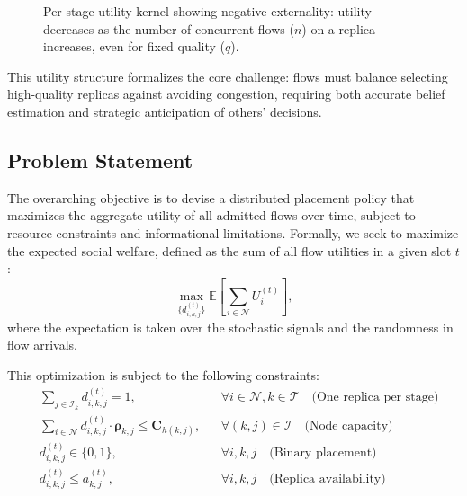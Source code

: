 \documentclass[journal]{IEEEtran}
\theoremstyle{plain}
\theoremstyle{definition}
\theoremstyle{remark}
\begin{document}
\begin{figure}[!t]
  \caption{Per-stage utility kernel showing negative externality: utility decreases as the number of concurrent flows ($n$) on a replica increases, even for fixed quality ($q$).}
  \label{fig:utility_function}
\end{figure}

This utility structure formalizes the core challenge: flows must balance selecting high-quality replicas against avoiding congestion, requiring both accurate belief estimation and strategic anticipation of others' decisions.


\subsection{Problem Statement}
\label{sec:sys_problem}

The overarching objective is to devise a distributed placement policy that maximizes the aggregate utility of all admitted flows over time, subject to resource constraints and informational limitations. Formally, we seek to maximize the expected social welfare, defined as the sum of all flow utilities in a given slot $t$:
\begin{equation}
\max_{\{d_{i,k,j}^{(t)}\}} \mathbb{E} \left[ \sum_{i \in \mathcal{N}} U_i^{(t)} \right],
\label{eq:social_welfare}
\end{equation}
where the expectation is taken over the stochastic signals and the randomness in flow arrivals.

This optimization is subject to the following constraints:
\begin{align}
& \sum_{j \in \mathcal{I}_k} d_{i,k,j}^{(t)} = 1, && \forall i \in \mathcal{N}, k \in \mathcal{T} \quad \text{(One replica per stage)} \label{eq:constraint_one_per_stage} \\
& \sum_{i \in \mathcal{N}} d_{i,k,j}^{(t)} \cdot \boldsymbol{\rho}_{k,j} \le \mathbf{C}_{h(k,j)}, && \forall (k,j) \in \mathcal{I} \quad \text{(Node capacity)} \label{eq:constraint_node_cap} \\
& d_{i,k,j}^{(t)} \in \{0,1\}, && \forall i,k,j \quad \text{(Binary placement)} \label{eq:constraint_binary} \\
& d_{i,k,j}^{(t)} \le a_{k,j}^{(t)}, && \forall i,k,j \quad \text{(Replica availability)} \label{eq:constraint_availability}
\end{align}
\end{document}
